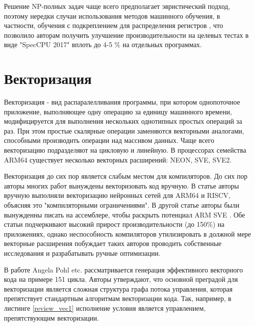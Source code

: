 Решение  NP-полных задач чаще всего предполагает эвристический подход, поэтому нередки случаи использования методов машинного обучения, в частности, обучения с подкреплением для распределения регистров \cite{venkatakeerthy2023rl4real}, что позволило авторам получить улучшение производительности на целевых тестах в виде "SpecCPU 2017"\phantom{} вплоть до 4-5 \% на отдельных программах.


\section{Векторизация} \label{pr:vectorization}
Векторизация - вид распаралелливания программы, при котором однопоточное приложение, выполняющее одну операцию за единицу машинного времени, модифицируется для выполнения нескольких однотипных простых операций за раз. При этом простые скалярные операции заменяются векторными аналогами, способными производить операции над массивом данных. Чаще всего векторизацию подразделяют на цикловую и линейную. \cite{pohl2018control} В процессорах семейства ARM64 существует несколько векторных расширений: NEON, SVE, SVE2. 

Векторизация до сих пор является слабым местом для компиляторов. До сих пор  авторы многих работ вынуждены векторизовать код вручную. В статье \cite{cococcioni2021vectorizing} авторы вручную выполняли векторизацию нейронных сетей для ARM64 и RISCV, объясняя это "компиляторными ограничениями"\phantom{}. В другой статье авторы были вынужденны писать на ассемблере, чтобы раскрыть потенциал ARM SVE \cite{armejach2020using}. Обе статьи подчеркивают высокий прирост производительности (до 150\%) на приложениях, однако неспособность компиляторов утилизировать в должной мере векторные расширения побуждает таких авторов проводить собственные исследования и разрабатывать ручные оптимизации.

В работе Angela Pohl etc. \cite{pohl2018control} рассматривается генерация эффективного векторного кода на примере 151 цикла. Авторы утверждают, что основной  преградой для векторизации является сложная структура графа потока управления, которая препятствует стандартным алгоритмам векторизации кода. 
 Так, например, в  листинге \ref{review_vec1} исполнение условия является управлением, препятствующим векторизации. 
 

